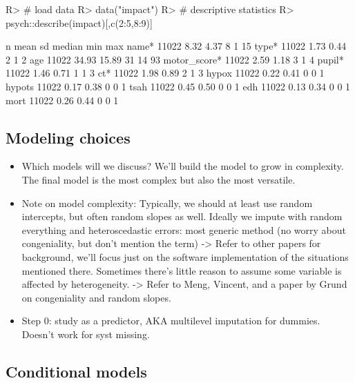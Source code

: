 \documentclass[
]{jss}
\begin{document}
\begin{CodeChunk}
\begin{CodeInput}
R> # load data
R> data("impact")
R> # descriptive statistics
R> psych::describe(impact)[,c(2:5,8:9)]
\end{CodeInput}
\begin{CodeOutput}
                 n  mean    sd median min max
name*        11022  8.32  4.37      8   1  15
type*        11022  1.73  0.44      2   1   2
age          11022 34.93 15.89     31  14  93
motor_score* 11022  2.59  1.18      3   1   4
pupil*       11022  1.46  0.71      1   1   3
ct*          11022  1.98  0.89      2   1   3
hypox        11022  0.22  0.41      0   0   1
hypots       11022  0.17  0.38      0   0   1
tsah         11022  0.45  0.50      0   0   1
edh          11022  0.13  0.34      0   0   1
mort         11022  0.26  0.44      0   0   1
\end{CodeOutput}
\end{CodeChunk}

\hypertarget{modeling-choices}{%
\subsection{Modeling choices}\label{modeling-choices}}

\begin{itemize}
\item
  Which models will we discuss? We'll build the model to grow in
  complexity. The final model is the most complex but also the most
  versatile.
\item
  Note on model complexity: Typically, we should at least use random
  intercepts, but often random slopes as well. Ideally we impute with
  random everything and heteroscedastic errors: most generic method (no
  worry about congeniality, but don't mention the term) -\textgreater{}
  Refer to other papers for background, we'll focus just on the software
  implementation of the situations mentioned there. Sometimes there's
  little reason to assume some variable is affected by heterogeneity.
  -\textgreater{} Refer to Meng, Vincent, and a paper by Grund on
  congeniality and random slopes.
\item
  Step 0: study as a predictor, AKA multilevel imputation for dummies.
  Doesn't work for syst missing.
\end{itemize}

\hypertarget{conditional-models}{%
\subsection{Conditional models}\label{conditional-models}}
\end{document}
